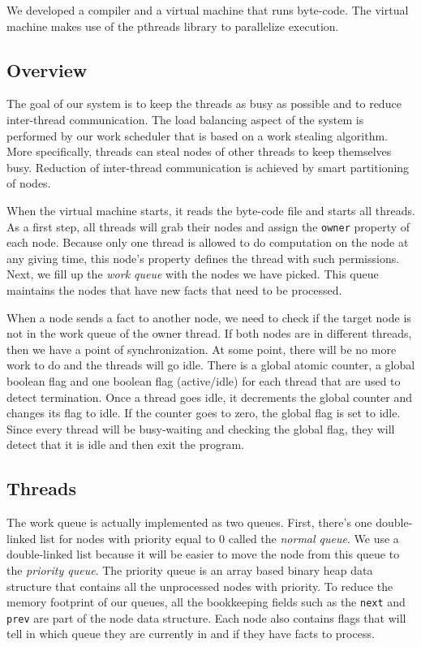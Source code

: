 
We developed a compiler and a virtual machine that runs
byte-code. The virtual machine makes use of the pthreads library to parallelize execution.

\subsection{Overview}

The goal of our system is to keep the threads as busy as possible and to reduce inter-thread communication.
The load balancing aspect of the system is performed by our work scheduler that is based on a work
stealing algorithm. More specifically, threads can steal nodes of other threads to keep themselves busy.
Reduction of inter-thread communication is achieved by smart partitioning of nodes.

When the virtual machine starts, it reads the byte-code file and starts all threads.
As a first step, all threads will grab their nodes and assign the \texttt{owner} property of each node.
Because only one thread is allowed to do computation on the node at any giving time, this node's property
defines the thread with such permissions.
Next, we fill up the \emph{work queue} with the nodes we have picked. This queue
maintains the nodes that have new facts that need to be processed.

When a node sends a fact to another node, we need to check if the target node is not in the work queue of the owner thread.
If both nodes are in different threads, then we have a point of synchronization. At some point,
there will be no more work to do and the threads will go idle. There is a global atomic counter, a global
boolean flag and one boolean flag (active/idle) for each thread that are used to detect termination.
Once a thread goes idle, it decrements the global counter and changes its flag to idle. If the counter
goes to zero, the global flag is set to idle. Since every thread will be busy-waiting and checking
the global flag, they will detect that it is idle and then exit the program.

\subsection{Threads}

The work queue is actually implemented as two queues. First, there's one double-linked list for nodes
with priority equal to 0 called the \emph{normal queue}.
We use a double-linked list because it will be easier to move the node from this queue to the
\emph{priority queue}. The priority queue is an array based binary heap data structure that contains
all the unprocessed nodes with priority. To reduce the memory footprint of our queues, all the bookkeeping fields
such as the \texttt{next} and \texttt{prev} are part of the node data structure.
Each node also contains flags that will tell in which queue they are currently in and if they have facts to process.

